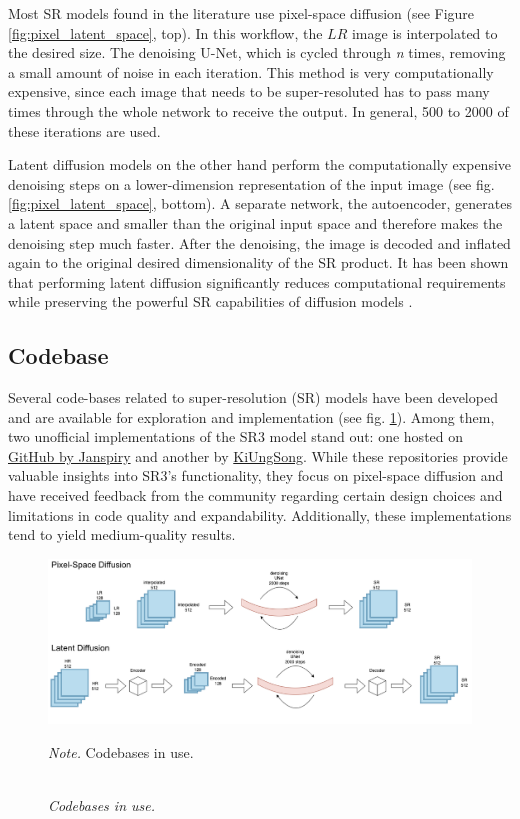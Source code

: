 Most SR models found in the literature use pixel-space diffusion (see Figure \ref{fig:pixel_latent_space}, top). In this workflow, the $LR$ image is interpolated to the desired size. The denoising U-Net, which is cycled through \textit{n} times, removing a small amount of noise in each iteration. This method is very computationally expensive, since each image that needs to be super-resoluted has to pass many times through the whole network to receive the output. In general, 500 to 2000 of these iterations are used.

Latent diffusion models on the other hand perform the computationally expensive denoising steps on a lower-dimension representation of the input image (see fig. \ref{fig:pixel_latent_space}, bottom). A separate network, the autoencoder, generates a latent space and smaller than the original input space and therefore makes the denoising step much faster. After the denoising, the image is decoded and inflated again to the original desired dimensionality of the SR product. It has been shown that performing latent diffusion significantly reduces computational requirements while preserving the powerful SR capabilities of diffusion models \autocite{rombach2022highresolution}.


\subsection{Codebase}

Several code-bases related to super-resolution (SR) models have been developed and are available for exploration and implementation (see fig. \ref{fig:codebase}). Among them, two unofficial implementations of the SR3 model \autocite{saharia2021image} stand out: one hosted on \href{https://github.com/Janspiry/Image-Super-Resolution-via-Iterative-Refinement}{GitHub by Janspiry} and another by \href{https://github.com/KiUngSong/Generative-Models/tree/main/SR3}{KiUngSong}. While these repositories provide valuable insights into SR3’s functionality, they focus on pixel-space diffusion and have received feedback from the community regarding certain design choices and limitations in code quality and expandability. Additionally, these implementations tend to yield medium-quality results.


\begin{figure}[H]
    \caption{\doublespacing \\ \textit{Codebases in use.}} 
    \centering
    \includegraphics[width=1\linewidth]{images/lat_px_dif.png}
    \begin{justify}
        \textit{Note.} Codebases in use.
    \end{justify}                    
    \label{fig:codebase}
\end{figure}

